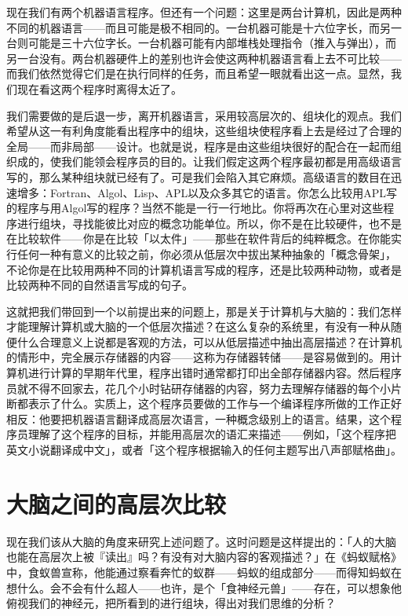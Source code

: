 \documentclass[
  12pt,
  twoside,
  openright,
  oldfontcommands,
]{memoir}
\begin{document}
现在我们有两个机器语言程序。但还有一个问题：这里是两台计算机，因此是两种不同的机器语言------而且可能是极不相同的。一台机器可能是十六位字长，而另一台则可能是三十六位字长。一台机器可能有内部堆栈处理指令（推入与弹出），而另一台没有。两台机器硬件上的差别也许会使这两种机器语言看上去不可比较------而我们依然觉得它们是在执行同样的任务，而且希望一眼就看出这一点。显然，我们现在看这两个程序时离得太近了。

我们需要做的是后退一步，离开机器语言，采用较高层次的、组块化的观点。我们希望从这一有利角度能看出程序中的组块，这些组块使程序看上去是经过了合理的全局------而非局部------设计。也就是说，程序是由这些组块很好的配合在一起而组织成的，使我们能领会程序员的目的。让我们假定这两个程序最初都是用高级语言写的，那么某种组块就已经有了。可是我们会陷入其它麻烦。高级语言的数目在迅速增多：Fortran、Algol、Lisp、APL以及众多其它的语言。你怎么比较用APL写的程序与用Algol写的程序？当然不能是一行一行地比。你将再次在心里对这些程序进行组块，寻找能彼比对应的概念功能单位。所以，你不是在比较硬件，也不是在比较软件------你是在比较「以太件」------那些在软件背后的纯粹概念。在你能实行任何一种有意义的比较之前，你必须从低层次中拔出某种抽象的「概念骨架」，不论你是在比较用两种不同的计算机语言写成的程序，还是比较两种动物，或者是比较两种不同的自然语言写成的句子。

这就把我们带回到一个以前提出来的问题上，那是关于计算机与大脑的：我们怎样才能理解计算机或大脑的一个低层次描述？在这么复杂的系统里，有没有一种从随便什么合理意义上说都是客观的方法，可以从低层描述中抽出高层描述？在计算机的情形中，完全展示存储器的内容------这称为存储器转储------是容易做到的。用计算机进行计算的早期年代里，程序出错时通常都打印出全部存储器内容。然后程序员就不得不回家去，花几个小时钻研存储器的内容，努力去理解存储器的每个小片断都表示了什么。实质上，这个程序员要做的工作与一个编译程序所做的工作正好相反：他要把机器语言翻译成高层次语言，一种概念级别上的语言。结果，这个程序员理解了这个程序的目标，并能用高层次的语汇来描述------例如，「这个程序把英文小说翻译成中文」，或者「这个程序根据输入的任何主题写出八声部赋格曲」。

\section{大脑之间的高层次比较}

现在我们该从大脑的角度来研究上述问题了。这时问题是这样提出的：「人的大脑也能在高层次上被『读出』吗？有没有对大脑内容的客观描述？」在《蚂蚁赋格》中，食蚁兽宣称，他能通过察看奔忙的蚁群------蚂蚁的组成部分------而得知蚂蚁在想什么。会不会有什么超人------也许，是个「食神经元兽」------存在，可以想象他俯视我们的神经元，把所看到的进行组块，得出对我们思维的分析？
\end{document}
